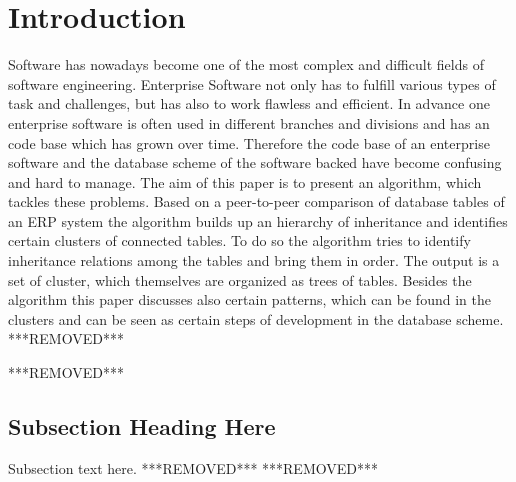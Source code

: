 \documentclass[10pt, journal, twocolumn]{IEEEtran}
\begin{document}
\section{Introduction}
% 
% 
% 
% 
 Software has nowadays become one of the most complex and difficult fields of software engineering. Enterprise Software not only has to fulfill various types of task and challenges, but has also to work flawless and efficient. In advance one enterprise software is often used in different branches and divisions and has an code base which has grown over time. Therefore the code base of an enterprise software and the database scheme of the software backed have become confusing and hard to manage. The aim of this paper is to present an algorithm, which tackles these problems. Based on a peer-to-peer comparison of database tables of an ERP system the algorithm builds up an hierarchy of inheritance and identifies certain clusters of connected tables. To do so the algorithm tries to identify inheritance relations among the tables and bring them in order. The output is a set of cluster, which themselves are organized as trees of tables. Besides the algorithm this paper discusses also certain patterns, which can be found in the clusters and can be seen as certain steps of development in the database scheme.  
***REMOVED***
 
***REMOVED***
\subsection{Subsection Heading Here}
Subsection text here.
***REMOVED***
***REMOVED***
\end{document}
